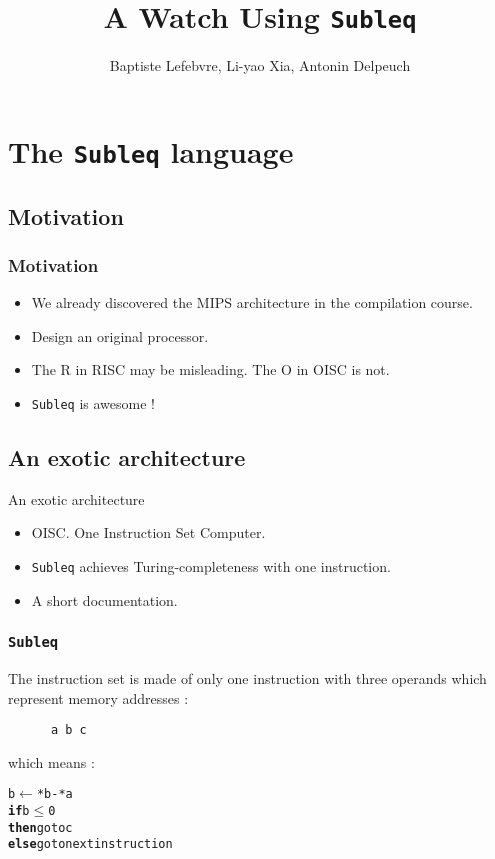 \documentclass{beamer}
\title{A Watch Using \texttt{Subleq}}
\author{Baptiste Lefebvre, Li-yao Xia, Antonin Delpeuch}
\date{\begin{tikzpicture}[scale=0.25, every node/.style={transform shape}]
        \node at (0,0) (n0) {};
        \SSGNb[0.75cm]{n0}{2}
        \node at (1,0) (n1) {};
        \SSGNb[0.75cm]{n1}{0}
        \node at (2,0) (n2) {};
        \SSGNb[0.75cm]{n2}{1}
        \node at (3,0) (n3) {};
        \SSGNb[0.75cm]{n3}{3}
        \node at (4.5,0) (n4) {};
        \SSGNb[0.75cm]{n4}{0}
        \node at (5.5,0) (n5) {};
        \SSGNb[0.75cm]{n5}{1}
        \node at (7,0) (n6) {};
        \SSGNb[0.75cm]{n6}{2}
        \node at (8,0) (n7) {};
        \SSGNb[0.75cm]{n7}{2}
        \node at (9.5,0) (n8) {};
        \SSGNb[0.75cm]{n8}{1}
        \node at (10.5,0) (n9) {};
        \SSGNb[0.75cm]{n9}{5}
        \node at (12,0) (n10) {};
        \SSGNb[0.75cm]{n10}{5}
        \node at (13,0) (n11) {};
        \SSGNb[0.75cm]{n11}{5}
  \end{tikzpicture}}
\begin{document}
\makeatletter

\begin{frame}
    \maketitle
\end{frame}

\begin{frame}
    \tableofcontents
\end{frame}

\section{The \texttt{Subleq} language}
\subsection{Motivation}
\begin{frame}
  \frametitle{Motivation}
  \begin{itemize}
    \item We already discovered the MIPS architecture
      in the compilation course.
    \item Design an original processor.
    \item The R in RISC may be misleading. The O in OISC is not.
    \item \texttt{Subleq} is awesome !
  \end{itemize}
\end{frame}

\subsection{An exotic architecture}
\begin{frame}{An exotic architecture}
  \begin{itemize}
    \item OISC. One Instruction Set Computer.
    \item \texttt{Subleq} achieves Turing-completeness with one instruction.
    \item A short documentation. %
  \end{itemize}
\end{frame}

\begin{frame}[fragile]
    \frametitle{\texttt{Subleq}}
    The instruction set is made of only one instruction with three
    operands which represent memory addresses :
    \\[11pt]
    \begin{verbatim}
      a b c
    \end{verbatim}
    which means :

    \begin{alltt}
       b \(\leftarrow\) *b - *a
      {\bf if} b \(\leq\) 0
      {\bf then} go to c
      {\bf else} go to next instruction
    \end{alltt}

\end{frame}
\end{document}
